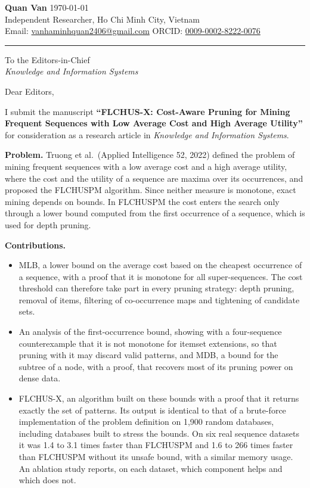 \documentclass[11pt,a4paper]{article}
\newcommand{\journal}{Knowledge and Information Systems}
\begin{document}
\textbf{Quan Van} \hfill \today \\
Independent Researcher, Ho Chi Minh City, Vietnam \\
Email: \href{mailto:vanhaminhquan2406@gmail.com}{vanhaminhquan2406@gmail.com} \quad ORCID: \href{https://orcid.org/0009-0002-8222-0076}{0009-0002-8222-0076}

\vspace{0.4em}
\hrule
\vspace{0.4em}

To the Editors-in-Chief \\
\textit{\journal}

Dear Editors,

I submit the manuscript \textbf{``FLCHUS-X: Cost-Aware Pruning for Mining Frequent Sequences with Low Average Cost and High Average Utility''} for consideration as a research article in \textit{\journal}.

\textbf{Problem.} Truong et al.\ (Applied Intelligence 52, 2022) defined the problem of mining frequent sequences with a low average cost and a high average utility, where the cost and the utility of a sequence are maxima over its occurrences, and proposed the FLCHUSPM algorithm. Since neither measure is monotone, exact mining depends on bounds. In FLCHUSPM the cost enters the search only through a lower bound computed from the first occurrence of a sequence, which is used for depth pruning.

\textbf{Contributions.}
\begin{itemize}\setlength{\itemsep}{2pt}
\item MLB, a lower bound on the average cost based on the cheapest occurrence of a sequence, with a proof that it is monotone for all super-sequences. The cost threshold can therefore take part in every pruning strategy: depth pruning, removal of items, filtering of co-occurrence maps and tightening of candidate sets.
\item An analysis of the first-occurrence bound, showing with a four-sequence counterexample that it is not monotone for itemset extensions, so that pruning with it may discard valid patterns, and MDB, a bound for the subtree of a node, with a proof, that recovers most of its pruning power on dense data.
\item FLCHUS-X, an algorithm built on these bounds with a proof that it returns exactly the set of patterns. Its output is identical to that of a brute-force implementation of the problem definition on 1,900 random databases, including databases built to stress the bounds. On six real sequence datasets it was 1.4 to 3.1 times faster than FLCHUSPM and 1.6 to 266 times faster than FLCHUSPM without its unsafe bound, with a similar memory usage. An ablation study reports, on each dataset, which component helps and which does not.
\end{itemize}
\end{document}
